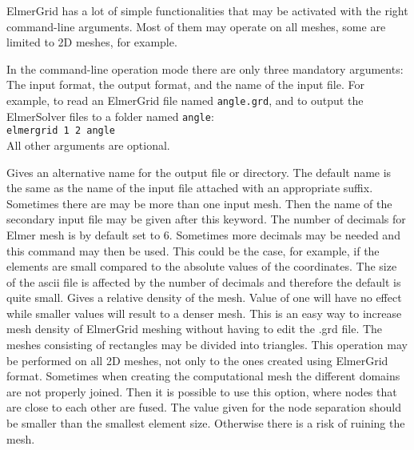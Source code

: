 ElmerGrid has a lot of simple functionalities that may be activated 
with the right command-line arguments. Most of them may operate on
all meshes, some are limited to 2D meshes, for example. 

In the command-line operation mode
there are only three mandatory arguments: The input format,
the output format, and the name of the input file.  For example, 
to read an ElmerGrid file named \texttt{angle.grd}, and to output the
ElmerSolver files to a folder named \texttt{angle}:\\

\texttt{elmergrid 1 2 angle}\\

All other arguments are optional.

\sifbegin
{}
Gives an alternative name for the output file or directory. 
The default name is the same as the name of the input file
attached with an appropriate suffix. 
%
Sometimes there are may be more than one input mesh. 
Then the name of the secondary input file may be given 
after this keyword.
%
The number of decimals for Elmer mesh is by default set to 6.
Sometimes more decimals may be needed and this command may then
be used. This could be the case, for example, if the elements are 
small compared to the absolute values of the coordinates.
The size of the ascii file is affected by the number of 
decimals and therefore the default is quite small.
%
Gives a relative density of the mesh. Value of one will have no effect
while smaller values will result to a denser mesh. This is an easy way to 
increase mesh density of ElmerGrid meshing without having to edit the .grd file. 
%
The meshes consisting of rectangles may be divided into 
triangles. This operation may be performed on all 2D meshes, 
not only to the ones created using ElmerGrid format.
%
Sometimes when creating the computational mesh the 
different domains are not properly joined. Then it is possible to 
use this option, where nodes that are close to each other are
fused. The value given for the node separation should be smaller than
the smallest element size. Otherwise there is a risk of ruining the mesh.

